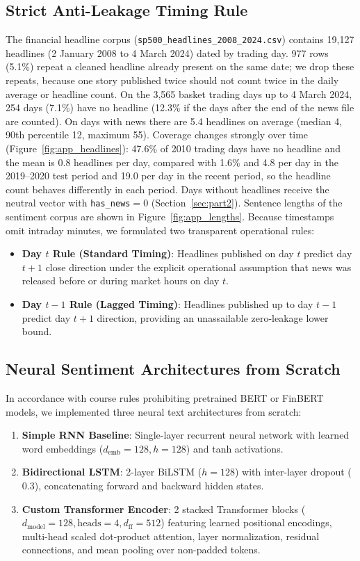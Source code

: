 \documentclass[10pt,journal]{IEEEtran}
\begin{document}
\subsection{Strict Anti-Leakage Timing Rule}
The financial headline corpus (\texttt{sp500\_headlines\_2008\_2024.csv}) contains 19,127 headlines (2 January 2008 to 4 March 2024) dated by trading day. 977 rows (5.1\%) repeat a cleaned headline already present on the same date; we drop these repeats, because one story published twice should not count twice in the daily average or headline count. On the 3,565 basket trading days up to 4 March 2024, 254 days (7.1\%) have no headline (12.3\% if the days after the end of the news file are counted). On days with news there are 5.4 headlines on average (median 4, 90th percentile 12, maximum 55). Coverage changes strongly over time (Figure~\ref{fig:app_headlines}): 47.6\% of 2010 trading days have no headline and the mean is 0.8 headlines per day, compared with 1.6\% and 4.8 per day in the 2019--2020 test period and 19.0 per day in the recent period, so the headline count behaves differently in each period. Days without headlines receive the neutral vector with \texttt{has\_news}$=0$ (Section~\ref{sec:part2}). Sentence lengths of the sentiment corpus are shown in Figure~\ref{fig:app_lengths}. Because timestamps omit intraday minutes, we formulated two transparent operational rules:
\begin{itemize}
  \item \textbf{Day $t$ Rule (Standard Timing)}: Headlines published on day $t$ predict day $t+1$ close direction under the explicit operational assumption that news was released before or during market hours on day $t$.
  \item \textbf{Day $t-1$ Rule (Lagged Timing)}: Headlines published up to day $t-1$ predict day $t+1$ direction, providing an unassailable zero-leakage lower bound.
\end{itemize}

\subsection{Neural Sentiment Architectures from Scratch}
In accordance with course rules prohibiting pretrained BERT or FinBERT models, we implemented three neural text architectures from scratch:
\begin{enumerate}
  \item \textbf{Simple RNN Baseline}: Single-layer recurrent neural network with learned word embeddings ($d_{\text{emb}} = 128, h = 128$) and tanh activations.
  \item \textbf{Bidirectional LSTM}: 2-layer BiLSTM ($h = 128$) with inter-layer dropout ($0.3$), concatenating forward and backward hidden states.
  \item \textbf{Custom Transformer Encoder}: 2 stacked Transformer blocks ($d_{\text{model}} = 128, \text{heads} = 4, d_{\text{ff}} = 512$) featuring learned positional encodings, multi-head scaled dot-product attention, layer normalization, residual connections, and mean pooling over non-padded tokens.
\end{enumerate}
\end{document}
